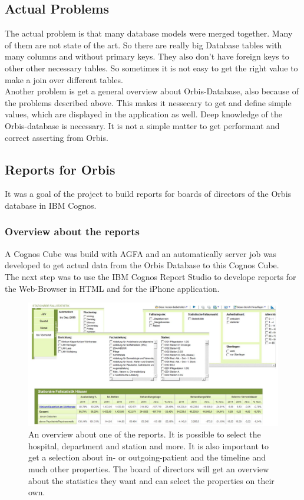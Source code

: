 \documentclass[a4paper]{article}
\begin{document}
	\subsection{Actual Problems}
	The actual problem is that many database models were merged together. Many of
	them are not state of the art. So there are really big Database tables with
	many columns and without primary keys. They also don't have foreign keys to
	other other necessary tables. So sometimes it is not easy to get the right
	value to make a join over different tables.\\
	Another problem is get a general overview about Orbis-Database, also because of
	the problems described above. This makes it nessecary to get and define
	simple values, which are displayed in the application as well. Deep
	knowledge of the Orbis-database is necessary. It is not
	a simple matter to get performant and correct asserting from Orbis.
	\subsection{Reports for Orbis}
	It was a goal of the project to build reports for boards of directors of the
	Orbis database in IBM Cognos. 
	\subsubsection{Overview about the reports}
	A Cognos Cube was build with AGFA and an automatically server job was developed
	to get actual data from the Orbis Database to this Cognos Cube.\\
	The next step was to use the IBM Cognos Report Studio to develope reports for
	the Web-Browser in HTML and for the iPhone application.
	\begin{figure}[!ht]
		  \centering
		      \includegraphics[width=1.0\textwidth]{reports_overview}
		  \caption{An overview about one of the reports. It is
		  possible to select the hospital, department and station and more. It is
		  also important to get a selection about in- or outgoing-patient and the
		  timeline and much other properties. The board of directors will get an
		  overview about the statistics they want and can select the properties on
		  their own.}
	\end{figure}
\end{document}
